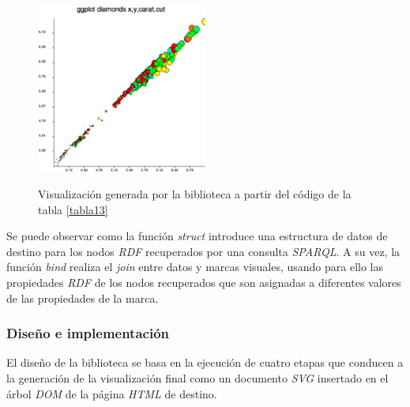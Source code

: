 \begin{figure}
\vspace{2.4in}
\caption{Visualizaci\'on generada por la biblioteca a partir del c\'odigo de la tabla \ref{tabla13}}
\includegraphics[width=0.5\textwidth]{figura7}
\label{figura7}
\end{figure}

Se puede observar como la funci\'on \textit{struct} introduce una estructura de datos de destino para los nodos \textit{RDF} recuperados por una consulta \textit{SPARQL}. A su vez, la funci\'on \textit{bind} realiza el \textit{join} entre datos y marcas visuales, usando para ello las propiedades \textit{RDF} de los nodos recuperados que son asignadas a diferentes valores de las propiedades de la marca.

\subsubsection{Dise\~no e implementaci\'on}

El dise\~no de la biblioteca se basa en la ejecuci\'on de cuatro etapas que conducen a la generaci\'on de la visualizaci\'on final como un documento \textit{SVG} insertado en el \'arbol \textit{DOM} de la p\'agina \textit{HTML} de destino.

